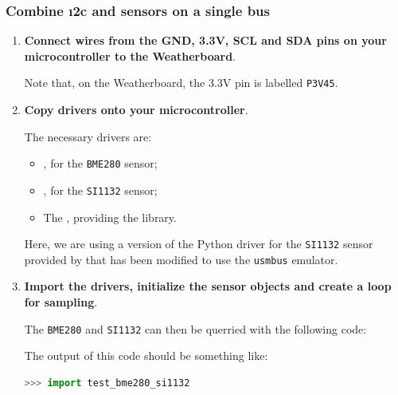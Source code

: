 \subsubsection{\howto Combine \i2c and \smbus sensors on a single bus}
\begin{enumerate}
	\item \textbf{Connect wires from the GND, 3.3V, SCL and SDA pins on your microcontroller to the Weatherboard}.

	Note that, on the Weatherboard, the 3.3V pin is labelled \texttt{P3V45}.

	\item \textbf{Copy drivers onto your microcontroller}.

	The necessary drivers are:
	\begin{itemize}
		\item {}, for the \texttt{BME280} sensor;
		\item {}, for the \texttt{SI1132} sensor;
		\item The , providing the \smbus library.
	\end{itemize}
	Here, we are using a version of the Python driver for the \texttt{SI1132} sensor provided by  that has been modified to use the \texttt{usmbus} \smbus emulator.

	\item \textbf{Import the drivers, initialize the sensor objects and create a loop for sampling}.

	The \texttt{BME280} and \texttt{SI1132} can then be querried with the following code:


The output of this code should be something like:
\begin{lstlisting}[language=Python]
>>> import test_bme280_si1132


\end{lstlisting}
\end{enumerate}
